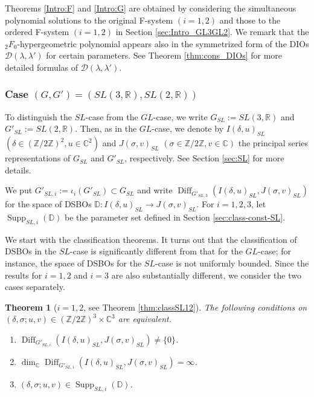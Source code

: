 \documentclass[a4paper,11pt,reqno]{amsart}
\newcommand{\CC}{\mathbb{C}}
\newcommand{\DD}{\mathbb{D}}
\newcommand{\RR}{\mathbb{R}}
\newcommand{\ZZ}{\mathbb{Z}}
\newcommand{\calD}{\mathcal{D}}
\newcommand{\0}{{\bf 0}}
\newcommand{\Z}{\mathbb{Z}}
\newcommand{\R}{\mathbb{R}}
\newcommand{\C}{\mathbb{C}}
\newcommand{\1}{{\bf 1}}
\DeclareMathOperator{\Supp}{Supp}
\DeclareMathOperator{\Diff}{Diff}
\theoremstyle{plain}
\newtheorem{thmalph}{Theorem}
\theoremstyle{definition}
\numberwithin{equation}{section}
\theoremstyle{definition}
\begin{document}
Theorems \ref{Intro:F} and \ref{Intro:G} are obtained by considering the simultaneous polynomial solutions to the original F-system $(i=1,2)$ 
and those to the ordered F-system $(i=1,2)$ in Section \ref{sec:Intro_GL3GL2}.
We remark that the ${}_2F_0$-hypergeometric polynomial 
appears also in the 
symmetrized form of the DIOs $\calD(\lambda, \lambda')$ for certain parameters. 
See Theorem \ref{thm:cons_DIOs} for more detailed formulas of 
$\calD(\lambda, \lambda')$.

\subsubsection{Case \texorpdfstring{$(G,G')=(SL(3,\R), SL(2,\R))$}{(G,G')=(SL(3,R),SL(2,R))}}

To distinguish the $SL$-case from the $GL$-case, 
we write $G_{SL}:=SL(3,\RR)$ and $G'_{SL}:=SL(2,\RR)$. 
Then, as in the $GL$-case, 
we denote by  $I(\delta,u)_{SL}$ $(\delta \in (\ZZ/2\ZZ)^2,u\in \CC^2)$ 
and $J(\sigma,v)_{SL}$ $(\sigma \in \ZZ/2\ZZ, v\in \CC)$
the principal series representations
of $G_{SL}$ and $G'_{SL}$, respectively. 
See Section \ref{sec:SL} for more details. 

We put $G'_{SL,i} := \iota_i(G'_{SL})\subset G_{SL}$ and 
write
$\Diff_{G'_{SL,3}}(I(\delta,u)_{SL}, J(\sigma,v)_{SL})$
for the space of 
DSBOs $\DD \colon I(\delta,u)_{SL} \to J(\sigma,v)_{SL}$.
For $i=1,2,3$,  let $\Supp_{SL,i}(\DD)$ be the parameter set defined in Section \ref{sec:class-const-SL}.

We start with the classification theorems. It turns out that the classification of DSBOs
in the $SL$-case is significantly different from that for the $GL$-case; 
for instance, the space of DSBOs for the $SL$-case is not uniformly bounded.
Since the results for $i=1,2$ and $i=3$ are also substantially different, 
we consider the two cases separately.

\begin{thmalph}
[{$i=1,2$, see Theorem \ref{thm:classSL12}}]
\label{Intro:H}
The following conditions on $(\delta,\sigma; u, v)  
\in (\Z/2\Z)^3\times \C^3$ are equivalent.
\begin{enumerate}[label=\normalfont{(\roman*)}]
\item $\Diff_{G'_{SL,i}}(I(\delta,u)_{SL}, J(\sigma,v)_{SL})\neq \{0\}$.
\item $\dim_\C\Diff_{G'_{SL,i}}(I(\delta,u)_{SL}, J(\sigma,v)_{SL})=\infty$.
\item $(\delta,\sigma; u, v) \in \Supp_{SL,i}(\DD)$.
\end{enumerate}
\end{thmalph}
\end{document}
